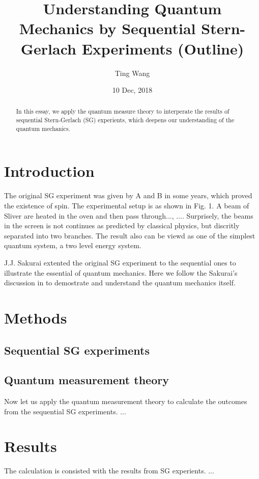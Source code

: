 \documentclass[a4paper]{article}
\begin{document}
\title{Understanding Quantum Mechanics by Sequential Stern-Gerlach Experiments (Outline)}
\author{Ting Wang}
\date{10 Dec, 2018}
\maketitle

\begin{abstract}
In this essay, we apply the quantum measure theory to interperate
the results of sequential Stern-Gerlach (SG) experients, which deepens
our understanding of the quantum mechanics.
\end{abstract}

\section{Introduction}
The original SG experiment was given by A and B in some years,
which proved the existence of spin.  The experimental setup is as shown in
Fig. 1.  A beam of Sliver are heated in the oven and then pass  through...,
.... Surprisely, the beams in the screen is not continues as predicted by
classical physics, but discritly separated into two branches.  The result
also can be viewd as one of the simplest quantum system, a two level energy system.

J.J. Sakurai extented the original SG experiment to the sequential ones to illustrate the essential
of quantum mechanics. Here we follow the Sakurai's discussion in \cite{sakurai1994modern} to
demostrate and understand the quantum mechanics itself.
\section{Methods}
\subsection{Sequential SG experiments}

\subsection{Quantum measurement theory}
Now let us apply the quantum measurement theory to calculate the outcomes from
the sequential SG experiments.
...



\section{Results}
The calculation is consisted with the results from SG experients. ...
\end{document}

